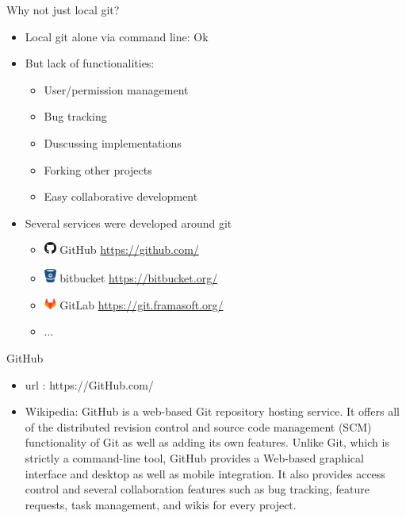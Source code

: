 \def\git#1{{\small\color{git}\$ git #1}\\}

\begin{frame}[fragile]{Why not just local git?}
  \begin{itemize}
  \item<1-> Local git alone via command line: Ok
  \item<2-> But lack of functionalities:
    \begin{itemize}
    \item User/permission management
    \item Bug tracking
    \item Duscussing implementations
    \item Forking other projects
    \item Easy collaborative development 
    \end{itemize}
  \item<3-> Several services were developed around git
    \begin{itemize}
    \item \includegraphics[width=15px]{images/GitHub-Mark.png} GitHub \url{https://github.com/}
    \item \includegraphics[width=15px]{images/bitbucket.png} bitbucket \url{https://bitbucket.org/}
    \item \includegraphics[width=15px]{images/GitLab_Logo.png} GitLab \url{https://git.framasoft.org/}
    \item ...
    \end{itemize}
  \end{itemize}
\end{frame}

\begin{frame}{GitHub}
  \begin{itemize}
  \item url : https://GitHub.com/ 
  \item Wikipedia: GitHub is a web-based Git repository hosting service. It offers all of the distributed revision control and source code management (SCM) functionality of Git as well as adding its own features. Unlike Git, which is strictly a command-line tool, GitHub provides a Web-based graphical interface and desktop as well as mobile integration. It also provides access control and several collaboration features such as bug tracking, feature requests, task management, and wikis for every project.
  \end{itemize}
\end{frame}

